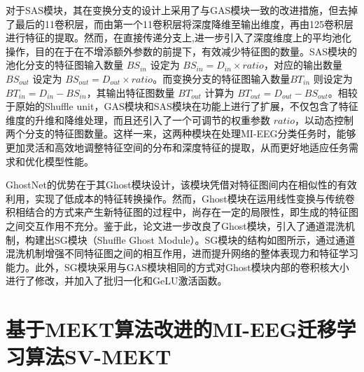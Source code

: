 对于SAS模块，其在变换分支的设计上采用了与GAS模块一致的改进措施，但去掉了最后的1\times1卷积层，而由第一个1\times1卷积层将深度降维至输出维度，再由1\times25卷积层进行特征的提取。然而，在直接传递分支上,进一步引入了深度维度上的平均池化操作，目的在于在不增添额外参数的前提下，有效减少特征图的数量。SAS模块的池化分支的特征图输入数量 \(BS_{in}\) 设定为 \(BS_{in} = D_{in} \times ratio\)，对应的输出数量 \(BS_{out}\) 设定为 \(BS_{out} = D_{out} \times ratio\)。而变换分支的特征图输入数量\(BT_{in}\) 则设定为 \(BT_{in} = D_{in} - BS_{in}\)，其输出特征图数量 \(BT_{out}\) 计算为 \(BT_{out} = D_{out} - BS_{out}\)。相较于原始的Shuffle unit，GAS模块和SAS模块在功能上进行了扩展，不仅包含了特征维度的升维和降维处理，而且还引入了一个可调节的权重参数  \(ratio\)，以动态控制两个分支的特征图数量。这样一来，这两种模块在处理MI-EEG分类任务时，能够更加灵活和高效地调整特征空间的分布和深度特征的提取，从而更好地适应任务需求和优化模型性能。

GhostNet的优势在于其Ghost模块设计，该模块凭借对特征图间内在相似性的有效利用，实现了低成本的特征转换操作。然而，Ghost模块在运用线性变换与传统卷积相结合的方式来产生新特征图的过程中，尚存在一定的局限性，即生成的特征图之间交互作用不充分。鉴于此，论文进一步改良了Ghost模块，引入了通道混洗机制，构建出SG模块（Shuffle Ghost Module）。SG模块的结构如图所示，通过通道混洗机制增强不同特征图之间的相互作用，进而提升网络的整体表现力和特征学习能力。此外，SG模块采用与GAS模块相同的方式对Ghost模块内部的卷积核大小进行了修改，并加入了批归一化和GeLU激活函数。

\section{基于MEKT算法改进的MI-EEG迁移学习算法SV-MEKT}

